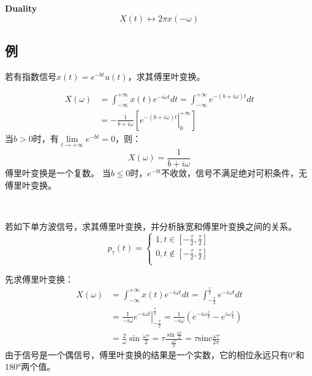 {\bf Duality}
\[
X\left( t \right) \leftrightarrow 2\pi x\left( -\omega \right)
\]

\subsection{例}

\begin{example}
若有指数信号$x\left( t \right) =e^{-bt}u\left( t \right) $，求其傅里叶变换。
\end{example}

\begin{align*}
X\left( \omega \right) &=\int_{-\infty}^{+\infty}{x\left( t \right) e^{-i\omega t}dt}=\int_{-\infty}^{+\infty}{e^{-\left( b+i\omega \right) t}dt} \\
&=-\frac{1}{b+i\omega}\left[ \left. e^{-\left( b+i\omega \right) t} \right|_{0}^{+\infty} \right]
\end{align*}
当$b>0$时，有$\underset{t\rightarrow +\infty}{\lim} e^{-bt}=0$，则：
\[
X\left( \omega \right) =\frac{1}{b+i\omega}
\]
傅里叶变换是一个复数。
当$b\leqslant 0$时，$e^{-bt}$不收敛，信号不满足绝对可积条件，无傅里叶变换。

~

\begin{example}
若如下单方波信号，求其傅里叶变换，并分析脉宽和傅里叶变换之间的关系。
\[
p_{\tau}\left( t \right) =\begin{cases}
	1,t\in \left[ -\frac{\tau}{2},\frac{\tau}{2} \right]\\
	0,t\notin \left[ -\frac{\tau}{2},\frac{\tau}{2} \right]\\
\end{cases}
\]
\end{example}

先求傅里叶变换：
\begin{align*}
X\left( \omega \right) &=\int_{-\infty}^{+\infty}{x\left( t \right) e^{-i\omega t}dt}=\int_{-\frac{\tau}{2}}^{\frac{\tau}{2}}{e^{-i\omega t}dt} \\
&=\frac{1}{-i\omega}\left. e^{-i\omega t} \right|_{-\frac{\tau}{2}}^{\frac{\tau}{2}}=\frac{1}{-i\omega}\left( e^{-i\omega \frac{\tau}{2}}-e^{i\omega \frac{\tau}{2}} \right) \\
&=\frac{2}{\omega}\sin \frac{\omega \tau}{2}=\tau \frac{\sin \frac{\omega \tau}{2}}{\frac{\omega \tau}{2}}=\tau \mathrm{sinc}\frac{\omega \tau}{2\pi}
\end{align*}
由于信号是一个偶信号，傅里叶变换的结果是一个实数，它的相位永远只有0°和180°两个值。

